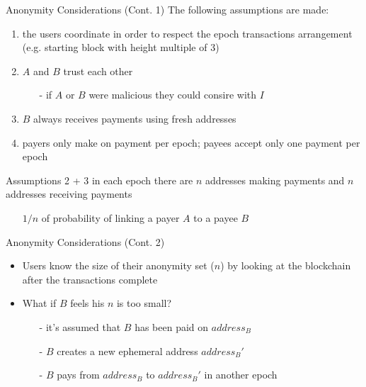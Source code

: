 \documentclass{beamer}
\begin{document}
  
  
  
  \begin{frame}{Anonymity Considerations (Cont. 1)}
      The following assumptions are made:  
      \begin{enumerate}
          \item the users coordinate in order to respect the epoch transactions arrangement (e.g. starting block with height multiple of 3) 
          \item $A$ and $B$ trust each other 
          \begin{itemize}
              \item[-] if $A$ or $B$ were malicious they could consire with $I$ 
          \end{itemize}
          \item $B$ always receives payments using fresh addresses
          \item payers only make on payment per epoch; payees accept only one payment per epoch
      \end{enumerate}
      \pause
      \begin{block}{}
      Assumptions 2 + 3 \MVRightarrow in each epoch there are $n$ addresses making payments and $n$ addresses receiving payments 
      \begin{itemize}
          \item[\MVRightarrow] $1/n$ of probability of linking a payer $A$ to a payee $B$
      \end{itemize}
      \end{block}
  \end{frame}
  
  
  
  \begin{frame}{Anonymity Considerations (Cont. 2)}
      \begin{itemize}
          \item Users know the size of their anonymity set ($n$) by looking at the blockchain after the transactions complete
          \item What if $B$ feels his $n$ is too small? \pause
          \begin{itemize}
              \item[-] it's assumed that $B$ has been paid on $address_B$
              \item[-] $B$ creates a new ephemeral address $address_B'$
              \item[-] $B$ pays from $address_B$ to $address_B'$ in another epoch
          \end{itemize}
      \end{itemize}
  \end{frame}
  
\end{document}
